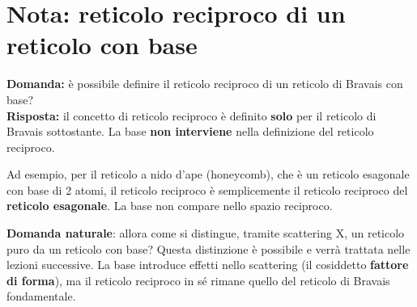 \section{Nota: reticolo reciproco di un reticolo con base}

\textbf{Domanda:} è possibile definire il reticolo reciproco di un reticolo di Bravais con base?\\
\textbf{Risposta:} il concetto di reticolo reciproco è definito \textbf{solo} per il reticolo di Bravais sottostante. La base \textbf{non interviene} nella definizione del reticolo reciproco.

Ad esempio, per il reticolo a nido d'ape (honeycomb), che è un reticolo esagonale con base di 2 atomi, il reticolo reciproco è semplicemente il reticolo reciproco del \textbf{reticolo esagonale}. La base non compare nello spazio reciproco.


\textbf{Domanda naturale}: allora come si distingue, tramite scattering X, un reticolo puro da un reticolo con base? Questa distinzione è possibile e verrà trattata nelle lezioni successive. La base introduce effetti nello scattering (il cosiddetto \textbf{fattore di forma}), ma il reticolo reciproco in sé rimane quello del reticolo di Bravais fondamentale.
